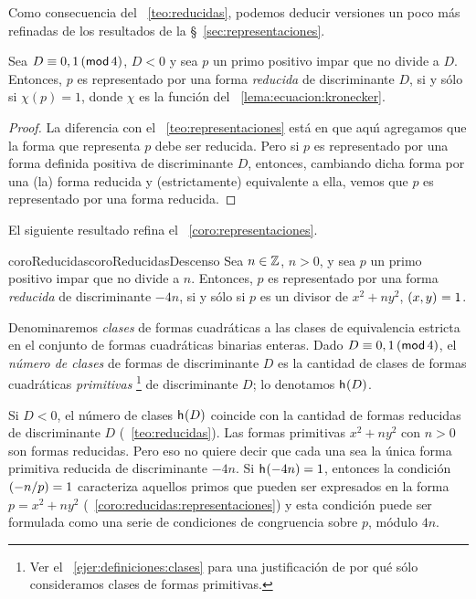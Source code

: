 Como consecuencia del \teoname~\ref{teo:reducidas},
podemos deducir versiones un poco m\'as refinadas de
los resultados de la \S~\ref{sec:representaciones}.

\begin{teoReducidas}\label{teo:reducidas:representaciones}
	Sea $D\equiv 0,1\tmodulo[4]$, $D<0$ y sea $p$ un primo positivo
	impar que no divide a $D$. Entonces, $p$ es representado por
	una forma \emph{reducida} de discriminante $D$,
	si y s\'olo si $\chi(p)=1$, donde $\chi$ es la funci\'on
	del \lemaname~\ref{lema:ecuacion:kronecker}.
\end{teoReducidas}

\begin{proof}
	La diferencia con el \teoname~\ref{teo:representaciones}
	est\'a en que aqu\'{\i} agregamos que la forma que representa
	$p$ debe ser reducida. Pero si $p$ es representado por
	una forma definida positiva de discriminante $D$, entonces,
	cambiando dicha forma por una (la) forma reducida y
	(estrictamente) equivalente a ella, vemos que $p$ es
	representado por una forma reducida.
\end{proof}

El siguiente resultado refina el \coroname~\ref{coro:representaciones}.

\begin{restatable}{coroReducidas}{coroReducidasDescenso}
	\label{coro:reducidas:representaciones}
	Sea $n\in\Enteros$, $n>0$, y sea $p$ un primo positivo impar
	que no divide a $n$. Entonces, $p$ es representado por una
	forma \emph{reducida} de discriminante $-4n$, si y s\'olo si
	$p$ es un divisor de $x^2+ny^2$, $\mcd{x,y}=1$.
\end{restatable}

\begin{defReducidas}\label{def:reducidas:numero}
	Denominaremos \emph{clases} de formas cuadr\'aticas a las
	clases de equivalencia estricta en el conjunto de formas
	cuadr\'aticas binarias enteras. Dado $D\equiv 0,1\tmodulo[4]$,
	el \emph{n\'umero de clases} de formas de discriminante $D$
	es la cantidad de clases de formas cuadr\'aticas
	\emph{primitivas}%
	\footnote{
		Ver el \ejername~\ref{ejer:definiciones:clases}
		para una justificaci\'on de por qu\'e s\'olo
		consideramos clases de formas primitivas.
	}
	de discriminante $D$; lo denotamos $\nClases(D)$.
\end{defReducidas}

\begin{obsReducidas}\label{obs:reducidas}
	Si $D<0$, el n\'umero de clases $\nClases(D)$ coincide
	con la cantidad de formas reducidas de discriminante $D$
	(\teoname~\ref{teo:reducidas}).
	Las formas primitivas $x^2+ny^2$ con $n>0$ son formas
	reducidas. Pero eso no quiere decir que cada una sea la
	\'unica forma primitiva reducida de discriminante $-4n$.
	Si $\nClases(-4n)=1$, entonces la condici\'on
	$\tlegendre{-n} p=1$ caracteriza aquellos primos que
	pueden ser expresados en la forma $p=x^2+ny^2$
	(\coroname~\ref{coro:reducidas:representaciones})
	y esta condici\'on puede ser formulada como una serie de
	condiciones de congruencia sobre $p$, m\'odulo $4n$.
\end{obsReducidas}

